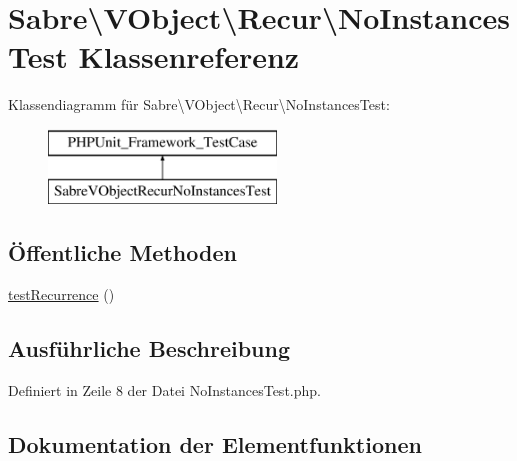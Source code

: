 \hypertarget{class_sabre_1_1_v_object_1_1_recur_1_1_no_instances_test}{}\section{Sabre\textbackslash{}V\+Object\textbackslash{}Recur\textbackslash{}No\+Instances\+Test Klassenreferenz}
\label{class_sabre_1_1_v_object_1_1_recur_1_1_no_instances_test}
Klassendiagramm für Sabre\textbackslash{}V\+Object\textbackslash{}Recur\textbackslash{}No\+Instances\+Test\+:\begin{figure}[H]
\begin{center}
\leavevmode
\includegraphics[height=2.000000cm]{class_sabre_1_1_v_object_1_1_recur_1_1_no_instances_test}
\end{center}
\end{figure}
\subsection*{Öffentliche Methoden}
\begin{DoxyCompactItemize}
\item 
\mbox{\hyperlink{class_sabre_1_1_v_object_1_1_recur_1_1_no_instances_test_a8e9f1f5fd1fac328fe55513fabab99dd}{test\+Recurrence}} ()
\end{DoxyCompactItemize}


\subsection{Ausführliche Beschreibung}


Definiert in Zeile 8 der Datei No\+Instances\+Test.\+php.



\subsection{Dokumentation der Elementfunktionen}
\mbox{\label{class_sabre_1_1_v_object_1_1_recur_1_1_no_instances_test_a8e9f1f5fd1fac328fe55513fabab99dd}} 
